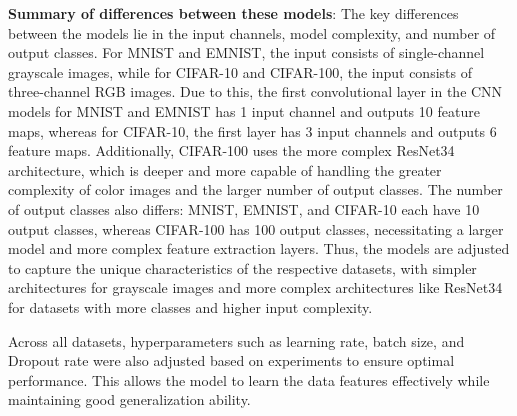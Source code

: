 \documentclass[a4paper,twoside,11pt,dvipsnames]{reviewresponse}
\begin{document}
\textbf{Summary of differences between these models}: The key differences between the models lie in the input channels, model complexity, and number of output classes. For MNIST and EMNIST, the input consists of single-channel grayscale images, while for CIFAR-10 and CIFAR-100, the input consists of three-channel RGB images. Due to this, the first convolutional layer in the CNN models for MNIST and EMNIST has 1 input channel and outputs 10 feature maps, whereas for CIFAR-10, the first layer has 3 input channels and outputs 6 feature maps. Additionally, CIFAR-100 uses the more complex ResNet34 architecture, which is deeper and more capable of handling the greater complexity of color images and the larger number of output classes. The number of output classes also differs: MNIST, EMNIST, and CIFAR-10 each have 10 output classes, whereas CIFAR-100 has 100 output classes, necessitating a larger model and more complex feature extraction layers. Thus, the models are adjusted to capture the unique characteristics of the respective datasets, with simpler architectures for grayscale images and more complex architectures like ResNet34 for datasets with more classes and higher input complexity.

Across all datasets, hyperparameters such as learning rate, batch size, and Dropout rate were also adjusted based on experiments to ensure optimal performance. This allows the model to learn the data features effectively while maintaining good generalization ability.
\end{document}

